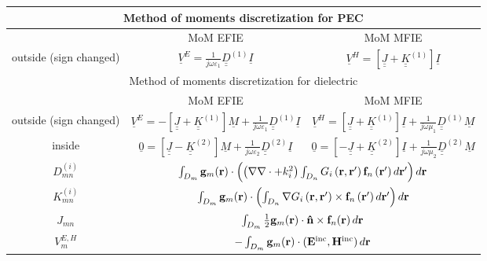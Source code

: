 \begin{table}[h!]
\centering
\begin{tabular}{|c||c|c|}
  \hline
  \multicolumn{3}{|c|}{Method of moments discretization for PEC} \\
  \hline
  \hline
   & MoM EFIE & MoM MFIE \\
  \hline
  outside (sign changed) & $\underline{V}^E =  \frac{1}{j \omega \varepsilon_1}  \underline{\underline{D}}^{(1)} \underline{I}$ & $\underline{V}^H =  \left[\underline{\underline{J}} + \underline{\underline{K}}^{(1)} \right] \underline{I}$ \\
  \hline
  \hline
  \multicolumn{3}{|c|}{Method of moments discretization for dielectric} \\
  \hline
  \hline
   & MoM EFIE & MoM MFIE \\
  \hline
  outside (sign changed) & $\underline{V}^E =  -\left[\underline{\underline{J}} + \underline{\underline{K}}^{(1)} \right] \underline{M} + \frac{1}{j \omega \varepsilon_1}  \underline{\underline{D}}^{(1)} \underline{I}$ & $\underline{V}^H =  \left[\underline{\underline{J}} + \underline{\underline{K}}^{(1)} \right] \underline{I} + \frac{1}{j \omega \mu_1}  \underline{\underline{D}}^{(1)} \underline{M}$ \\
  \hline
  inside  & $\underline{0} =  \left[\underline{\underline{J}} - \underline{\underline{K}}^{(2)} \right] \underline{M} + \frac{1}{j \omega \varepsilon_2}  \underline{\underline{D}}^{(2)} \underline{I}$ & $\underline{0} =  \left[-\underline{\underline{J}} + \underline{\underline{K}}^{(2)} \right] \underline{I} + \frac{1}{j \omega \mu_2}  \underline{\underline{D}}^{(2)} \underline{M}$ \\
  \hline
  \hline
$D_{mn}^{(i)}$ & \multicolumn{2}{|c|}{$\int_{D_m}\mathbf{g}_m \!\left(\mathbf{r}\right) \cdot \left( \left(\nabla \nabla \cdot + k_i^2\right) \int_{D_n} G_i\left(\mathbf{r}, \mathbf{r}'\right) \mathbf{f}_n\left(\mathbf{r}'\right) d\mathbf{r}' \right) d\mathbf{r}$} \\
\hline
 $K_{mn}^{(i)}$ & \multicolumn{2}{|c|}{$\int_{D_m} \mathbf{g}_m \!\left(\mathbf{r}\right) \cdot \left(\int_{D_n} \nabla G_i\left(\mathbf{r}, \mathbf{r}'\right) \times \mathbf{f}_n\left(\mathbf{r}'\right) d\mathbf{r}'\right) d\mathbf{r}$} \\
  \hline
$J_{mn}$ & \multicolumn{2}{|c|}{$\int_{D_m} \frac{1}{2} \mathbf{g}_m \!\left(\mathbf{r}\right) \cdot \mathbf{\hat{n}} \times \mathbf{f}_{n}\!\left(\mathbf{r}\right)d\mathbf{r}$} \\
  \hline
$V_m^{E,H}$ & \multicolumn{2}{|c|}{$-\int_{D_m}\mathbf{g}_m \!\left(\mathbf{r}\right) \cdot \left(\mathbf{E}^\text{inc},\mathbf{H}^\text{inc}\right) d\mathbf{r}$} \\
\hline
\end{tabular}
\end{table}


